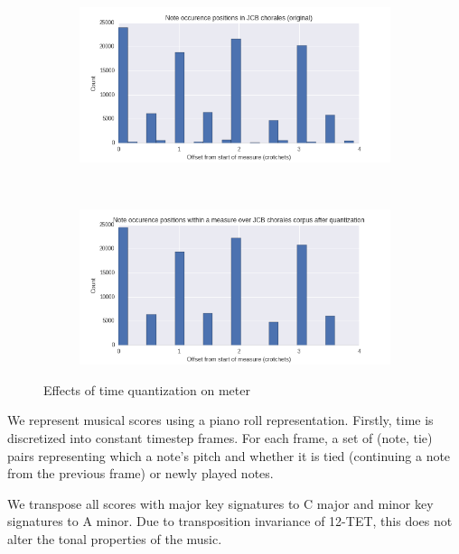 \begin{figure}[htpb]
    \centering
    \begin{subfigure}[t]{0.48\textwidth}
        \centering
        \includegraphics[width=1.0\linewidth]{Figures/meter-usage-original.png}
    \end{subfigure}
    ~
    \begin{subfigure}[t]{0.48\textwidth}
        \centering
        \includegraphics[width=1.0\linewidth]{Figures/meter-usage-quantized.png}
    \end{subfigure}
    \caption{Effects of time quantization on meter}
    \label{fig:meter-time-quantization}
\end{figure}

We represent musical scores using a piano roll representation. Firstly, time is
discretized into constant timestep frames. For each frame, a set of (note, tie)
pairs representing which a note's pitch and whether it is tied
(continuing a note from the previous frame) or newly played notes.


We transpose all scores with major key signatures to C major and minor key
signatures to A minor. Due to transposition invariance of 12-TET, this does
not alter the tonal properties of the music.

